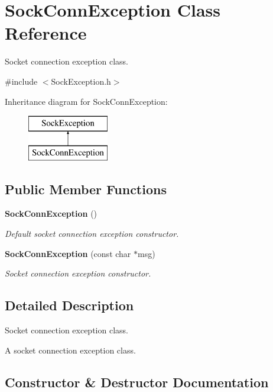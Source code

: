 \section{\-Sock\-Conn\-Exception \-Class \-Reference}
\label{classSockConnException}


\-Socket connection exception class.  




{\ttfamily \#include $<$\-Sock\-Exception.\-h$>$}

\-Inheritance diagram for \-Sock\-Conn\-Exception\-:\begin{figure}[H]
\begin{center}
\leavevmode
\includegraphics[height=2.000000cm]{classSockConnException}
\end{center}
\end{figure}
\subsection*{\-Public \-Member \-Functions}
\begin{DoxyCompactItemize}
\item 
{\bf \-Sock\-Conn\-Exception} ()
\begin{DoxyCompactList}\small\item\em \-Default socket connection exception constructor. \end{DoxyCompactList}\item 
{\bf \-Sock\-Conn\-Exception} (const char $\ast$msg)
\begin{DoxyCompactList}\small\item\em \-Socket connection exception constructor. \end{DoxyCompactList}\end{DoxyCompactItemize}


\subsection{\-Detailed \-Description}
\-Socket connection exception class. 

\-A socket connection exception class. 

\subsection{\-Constructor \& \-Destructor \-Documentation}
